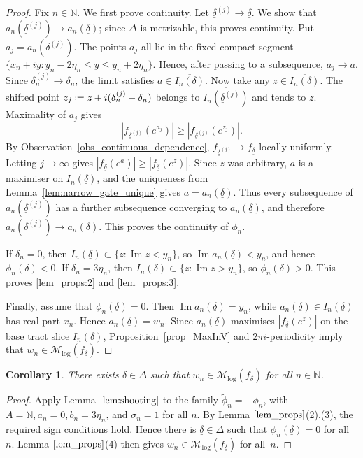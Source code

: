 \documentclass[a4paper, 11pt, reqno]{amsart}
\numberwithin{equation}{section}
\theoremstyle{plain}
\newtheorem{corollary}[theorem]{Corollary}
\newcommand*{\defeq}{\mathrel{\vcenter{\baselineskip0.5ex \lineskiplimit0pt
 \hbox{\scriptsize.}\hbox{\scriptsize.}}}=}
\theoremstyle{remark}
\newcommand{\N}{{\mathbb{N}}}
\newcommand{\Mlog}{{\mathcal{M}_{\log}}}
\newcommand{\uldelta}{\underline{\delta}}
\newcommand{\Ima}{\operatorname{Im }}
\begin{document}
\begin{proof}
	Fix \(n\in\N\). We first prove continuity. Let \(\uldelta^{(j)}\to\uldelta\).
	We show that \(a_n(\uldelta^{(j)})\to a_n(\uldelta)\); since
	\(\Delta\) is metrizable, this proves continuity. Put
	\(a_j=a_n(\uldelta^{(j)})\). The points \(a_j\) all lie in the fixed
	compact segment \(\{x_n+iy:y_n-2\eta_n\le y\le y_n+2\eta_n\}\).
	Hence, after passing to a subsequence, \(a_j\to a\). Since
	\(\delta_n^{(j)}\to\delta_n\), the limit satisfies
	\(a\in\overline{I_n(\uldelta)}\). Now take any \(z\in\overline{I_n(\uldelta)}\). The shifted point
	\(z_j\defeq z+i(\delta_n^{(j)}-\delta_n)\) belongs to
	\(\overline{I_n(\uldelta^{(j)})}\) and tends to \(z\). Maximality of
	\(a_j\) gives
	\[
	|f_{\uldelta^{(j)}}(e^{a_j})|\ge |f_{\uldelta^{(j)}}(e^{z_j})|.
	\]
	By Observation~\ref{obs_continuous_dependence},
	\(f_{\uldelta^{(j)}}\to f_{\uldelta}\) locally uniformly. Letting
	\(j\to\infty\) gives \(|f_{\uldelta}(e^a)|\ge |f_{\uldelta}(e^z)|\).
	Since \(z\) was arbitrary, \(a\) is a maximiser on
	\(\overline{I_n(\uldelta)}\), and the uniqueness from
	Lemma~\ref{lem:narrow_gate_unique} gives \(a=a_n(\uldelta)\). Thus every
	subsequence of \(a_n(\uldelta^{(j)})\) has a further subsequence converging to
	\(a_n(\uldelta)\), and therefore \(a_n(\uldelta^{(j)})\to a_n(\uldelta)\).
	This proves the continuity of \(\phi_n\).
	
	If \(\delta_n=0\), then \(I_n(\uldelta)\subset\{z:\Ima z<y_n\}\), so \(\Ima a_n(\uldelta)<y_n\), and hence \(\phi_n(\uldelta)<0\). If \(\delta_n=3\eta_n\), then \(I_n(\uldelta)\subset\{z:\Ima z>y_n\}\), so \(\phi_n(\uldelta)>0\). This proves \eqref{lem_props:2} and \eqref{lem_props:3}.
	
	Finally, assume that \(\phi_n(\uldelta)=0\). Then \(\Ima a_n(\uldelta)=y_n\), while \(a_n(\uldelta)\in I_n(\uldelta)\) has real part \(x_n\). Hence \(a_n(\uldelta)=w_n\). Since \(a_n(\uldelta)\) maximises \(|f_{\uldelta}(e^z)|\) on the base tract slice \(I_n(\uldelta)\), Proposition~\ref{prop_MaxInV} and \(2\pi i\)-periodicity imply that \(w_n\in\Mlog(f_{\uldelta})\).
\end{proof}

\begin{corollary}\label{cor:choose_delta}
	There exists \(\uldelta\in\Delta\) such that \(w_n\in\Mlog(f_{\uldelta})\) for all \(n\in\N\).
\end{corollary}

\begin{proof}
	Apply Lemma \(\ref{lem:shooting}\) to the family $\widetilde\phi_n=-\phi_n$, with $A=\mathbb N, a_n=0, b_n=3\eta_n$, and $\sigma_n=1$ for all $n$. By Lemma \(\ref{lem_props}\)(2),(3), the required sign conditions hold. Hence there is \(\uldelta\in\Delta\) such that \(\phi_n(\uldelta)=0\) for all $n$. Lemma \(\ref{lem_props}\)(4) then gives \(w_n\in\Mlog(f_{\uldelta})\) for all~$n$.
\end{proof}
\end{document}
